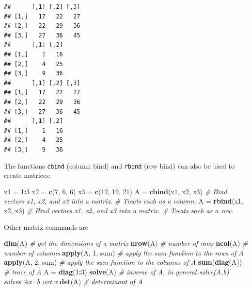 \documentclass[]{article}
\newenvironment{Shaded}{\begin{snugshade}}{\end{snugshade}}
\newcommand{\KeywordTok}[1]{\textcolor[rgb]{0.13,0.29,0.53}{\textbf{#1}}}
\newcommand{\DecValTok}[1]{\textcolor[rgb]{0.00,0.00,0.81}{#1}}
\newcommand{\StringTok}[1]{\textcolor[rgb]{0.31,0.60,0.02}{#1}}
\newcommand{\CommentTok}[1]{\textcolor[rgb]{0.56,0.35,0.01}{\textit{#1}}}
\newcommand{\OperatorTok}[1]{\textcolor[rgb]{0.81,0.36,0.00}{\textbf{#1}}}
\newcommand{\NormalTok}[1]{#1}
\begin{document}
\begin{Shaded}
\end{Shaded}

\begin{verbatim}
##      [,1] [,2] [,3]
## [1,]   17   22   27
## [2,]   22   29   36
## [3,]   27   36   45
##      [,1] [,2]
## [1,]    1   16
## [2,]    4   25
## [3,]    9   36
##      [,1] [,2] [,3]
## [1,]   17   22   27
## [2,]   22   29   36
## [3,]   27   36   45
##      [,1] [,2]
## [1,]    1   16
## [2,]    4   25
## [3,]    9   36
\end{verbatim}

The functions \texttt{cbind} (column bind) and \texttt{rbind} (row bind)
can also be used to create matrices:

\begin{Shaded}
\begin{Highlighting}[]
\NormalTok{x1 =}\StringTok{ }\DecValTok{1}\OperatorTok{:}\DecValTok{3}
\NormalTok{x2 =}\StringTok{ }\KeywordTok{c}\NormalTok{(}\DecValTok{7}\NormalTok{, }\DecValTok{6}\NormalTok{, }\DecValTok{6}\NormalTok{)}
\NormalTok{x3 =}\StringTok{ }\KeywordTok{c}\NormalTok{(}\DecValTok{12}\NormalTok{, }\DecValTok{19}\NormalTok{, }\DecValTok{21}\NormalTok{)}
\NormalTok{A =}\StringTok{ }\KeywordTok{cbind}\NormalTok{(x1, x2, x3)  }\CommentTok{# Bind vectors x1, x2, and x3 into a matrix.}
\CommentTok{# Treats each as a column.}
\NormalTok{A =}\StringTok{ }\KeywordTok{rbind}\NormalTok{(x1, x2, x3)  }\CommentTok{# Bind vectors x1, x2, and x3 into a matrix.}
\CommentTok{# Treats each as a row.}
\end{Highlighting}
\end{Shaded}

Other matrix commands are

\begin{Shaded}
\begin{Highlighting}[]
\KeywordTok{dim}\NormalTok{(A)  }\CommentTok{# get the dimensions of a matrix}
\KeywordTok{nrow}\NormalTok{(A)  }\CommentTok{# number of rows}
\KeywordTok{ncol}\NormalTok{(A)  }\CommentTok{# number of columns}
\KeywordTok{apply}\NormalTok{(A, }\DecValTok{1}\NormalTok{, sum)  }\CommentTok{# apply the sum function to the rows of A}
\KeywordTok{apply}\NormalTok{(A, }\DecValTok{2}\NormalTok{, sum)  }\CommentTok{# apply the sum function to the columns of A}
\KeywordTok{sum}\NormalTok{(}\KeywordTok{diag}\NormalTok{(A))  }\CommentTok{# trace of A}
\NormalTok{A =}\StringTok{ }\KeywordTok{diag}\NormalTok{(}\DecValTok{1}\OperatorTok{:}\DecValTok{3}\NormalTok{)}
\KeywordTok{solve}\NormalTok{(A)  }\CommentTok{# inverse of A, in general solve(A,b) solves Ax=b wrt x}
\KeywordTok{det}\NormalTok{(A)  }\CommentTok{# determinant of A}
\end{Highlighting}
\end{Shaded}
\end{document}
